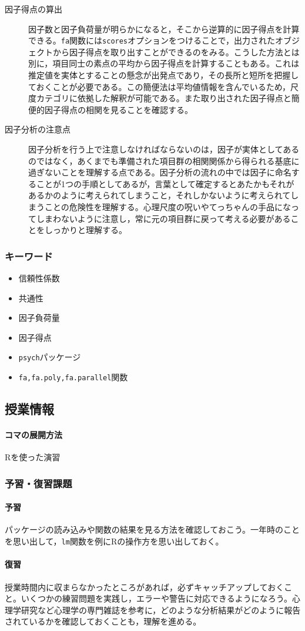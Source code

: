 \begin{description}
    \item[因子得点の算出] 因子数と因子負荷量が明らかになると，そこから逆算的に因子得点を計算できる。\texttt{fa}関数には\texttt{scores}オプションをつけることで，出力されたオブジェクトから因子得点を取り出すことができるのをみる。こうした方法とは別に，項目同士の素点の平均から因子得点を計算することもある。これは推定値を実体とすることの懸念が出発点であり，その長所と短所を把握しておくことが必要である。この簡便法は平均値情報を含んでいるため，尺度カテゴリに依拠した解釈が可能である。また取り出された因子得点と簡便的因子得点の相関を見ることを確認する。
    \item[因子分析の注意点] 因子分析を行う上で注意しなければならないのは，因子が実体としてあるのではなく，あくまでも準備された項目群の相関関係から得られる基底に過ぎないことを理解する点である。因子分析の流れの中では因子に命名することが1つの手順としてあるが，言葉として確定するとあたかもそれがあるかのように考えられてしまうこと，それしかないように考えられてしまうことの危険性を理解する。心理尺度の呪いやてっちゃんの手品になってしまわないように注意し，常に元の項目群に戻って考える必要があることをしっかりと理解する。
    
\end{description}
\subsubsection{キーワード}
\begin{itemize}
\item 信頼性係数
\item 共通性
\item 因子負荷量
\item 因子得点
\item \texttt{psych}パッケージ
\item \texttt{fa,fa.poly,fa.parallel}関数
\end{itemize}
\subsection{授業情報}
\paragraph{コマの展開方法}
Rを使った演習
\subsubsection{予習・復習課題}
\paragraph{予習}パッケージの読み込みや関数の結果を見る方法を確認しておこう。一年時のことを思い出して，\texttt{lm}関数を例にRの操作方を思い出しておく。
\paragraph{復習}授業時間内に収まらなかったところがあれば，必ずキャッチアップしておくこと。いくつかの練習問題を実践し，エラーや警告に対応できるようになろう。心理学研究など心理学の専門雑誌を参考に，どのような分析結果がどのように報告されているかを確認しておくことも，理解を進める。